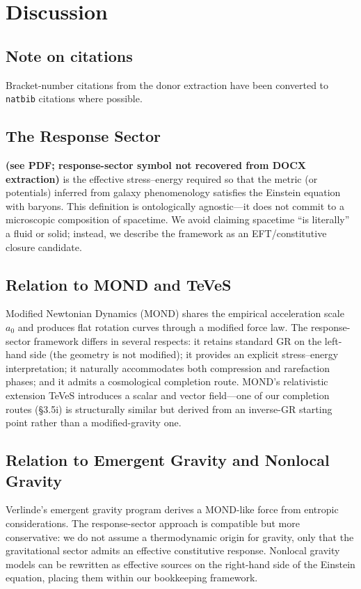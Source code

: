 \section{Discussion}

\subsection*{Note on citations}
Bracket-number citations from the donor extraction have been converted to \texttt{natbib} citations where possible.

\subsection{The Response Sector}

\textbf{(see PDF; response-sector symbol not recovered from DOCX extraction)} is the effective stress--energy required so that the metric (or potentials) inferred from galaxy phenomenology satisfies the Einstein equation with baryons. This definition is ontologically agnostic---it does not commit to a microscopic composition of spacetime. We avoid claiming spacetime ``is literally'' a fluid or solid; instead, we describe the framework as an EFT/constitutive closure candidate.

\subsection{Relation to MOND and TeVeS}

Modified Newtonian Dynamics (MOND) \citep{Milgrom1983} shares the empirical acceleration scale $a_0$ and produces flat rotation curves through a modified force law. The response-sector framework differs in several respects: it retains standard GR on the left-hand side (the geometry is not modified); it provides an explicit stress--energy interpretation; it naturally accommodates both compression and rarefaction phases; and it admits a cosmological completion route. MOND's relativistic extension TeVeS \citep{Bekenstein2004} introduces a scalar and vector field---one of our completion routes (\S3.5i) is structurally similar but derived from an inverse-GR starting point rather than a modified-gravity one.

\subsection{Relation to Emergent Gravity and Nonlocal Gravity}

Verlinde's emergent gravity program \citep{Verlinde2017} derives a MOND-like force from entropic considerations. The response-sector approach is compatible but more conservative: we do not assume a thermodynamic origin for gravity, only that the gravitational sector admits an effective constitutive response. Nonlocal gravity models \citep{DeserWoodard2007} can be rewritten as effective sources on the right-hand side of the Einstein equation, placing them within our bookkeeping framework.

